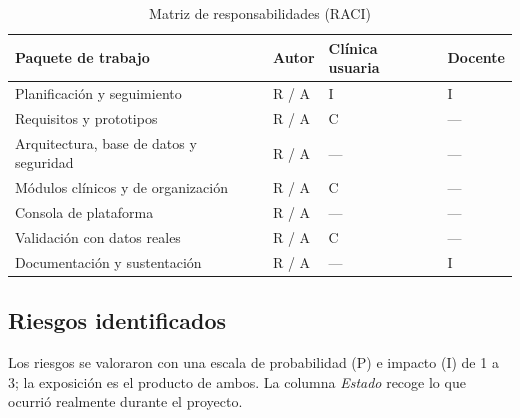 \documentclass[11pt]{article}
\begin{document}
\begin{table}[H]
\centering\small
\caption{Matriz de responsabilidades (RACI)}\label{tab:raci}
\begin{tabularx}{\linewidth}{@{}L>{\centering\arraybackslash}p{2.8cm}>{\centering\arraybackslash}p{2.6cm}>{\centering\arraybackslash}p{2.4cm}@{}}
\toprule
\textbf{Paquete de trabajo} & \textbf{Autor} & \textbf{Clínica usuaria} & \textbf{Docente} \\
\midrule
Planificación y seguimiento & R / A & I & I \\
Requisitos y prototipos & R / A & C & --- \\
Arquitectura, base de datos y seguridad & R / A & --- & --- \\
Módulos clínicos y de organización & R / A & C & --- \\
Consola de plataforma & R / A & --- & --- \\
Validación con datos reales & R / A & C & --- \\
Documentación y sustentación & R / A & --- & I \\
\bottomrule
\end{tabularx}
\end{table}

\subsection{Riesgos identificados}

Los riesgos se valoraron con una escala de probabilidad (P) e impacto (I) de 1 a 3; la exposición es el producto de ambos. La columna \emph{Estado} recoge lo que ocurrió realmente durante el proyecto.
\end{document}
